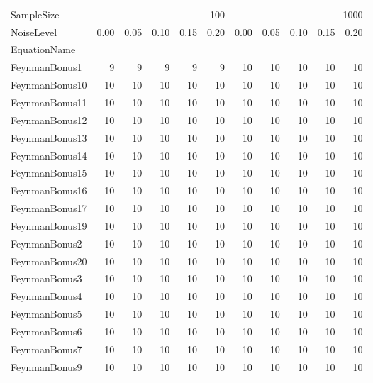 \begin{tabular}{lrrrrrrrrrr}
\toprule
SampleSize & \multicolumn{5}{r}{100} & \multicolumn{5}{r}{1000} \\
NoiseLevel & 0.00 & 0.05 & 0.10 & 0.15 & 0.20 & 0.00 & 0.05 & 0.10 & 0.15 & 0.20 \\
EquationName &  &  &  &  &  &  &  &  &  &  \\
\midrule
FeynmanBonus1 & 9 & 9 & 9 & 9 & 9 & 10 & 10 & 10 & 10 & 10 \\
FeynmanBonus10 & 10 & 10 & 10 & 10 & 10 & 10 & 10 & 10 & 10 & 10 \\
FeynmanBonus11 & 10 & 10 & 10 & 10 & 10 & 10 & 10 & 10 & 10 & 10 \\
FeynmanBonus12 & 10 & 10 & 10 & 10 & 10 & 10 & 10 & 10 & 10 & 10 \\
FeynmanBonus13 & 10 & 10 & 10 & 10 & 10 & 10 & 10 & 10 & 10 & 10 \\
FeynmanBonus14 & 10 & 10 & 10 & 10 & 10 & 10 & 10 & 10 & 10 & 10 \\
FeynmanBonus15 & 10 & 10 & 10 & 10 & 10 & 10 & 10 & 10 & 10 & 10 \\
FeynmanBonus16 & 10 & 10 & 10 & 10 & 10 & 10 & 10 & 10 & 10 & 10 \\
FeynmanBonus17 & 10 & 10 & 10 & 10 & 10 & 10 & 10 & 10 & 10 & 10 \\
FeynmanBonus19 & 10 & 10 & 10 & 10 & 10 & 10 & 10 & 10 & 10 & 10 \\
FeynmanBonus2 & 10 & 10 & 10 & 10 & 10 & 10 & 10 & 10 & 10 & 10 \\
FeynmanBonus20 & 10 & 10 & 10 & 10 & 10 & 10 & 10 & 10 & 10 & 10 \\
FeynmanBonus3 & 10 & 10 & 10 & 10 & 10 & 10 & 10 & 10 & 10 & 10 \\
FeynmanBonus4 & 10 & 10 & 10 & 10 & 10 & 10 & 10 & 10 & 10 & 10 \\
FeynmanBonus5 & 10 & 10 & 10 & 10 & 10 & 10 & 10 & 10 & 10 & 10 \\
FeynmanBonus6 & 10 & 10 & 10 & 10 & 10 & 10 & 10 & 10 & 10 & 10 \\
FeynmanBonus7 & 10 & 10 & 10 & 10 & 10 & 10 & 10 & 10 & 10 & 10 \\
FeynmanBonus9 & 10 & 10 & 10 & 10 & 10 & 10 & 10 & 10 & 10 & 10 \\
\bottomrule
\end{tabular}
